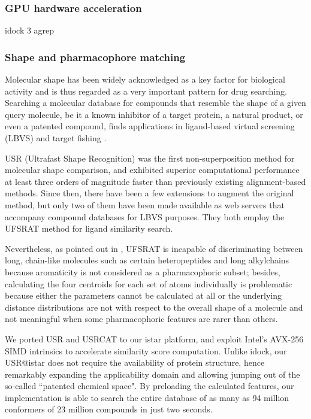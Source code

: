 \documentclass[a4paper,12pt]{article}
\begin{document}
\subsubsection*{GPU hardware acceleration}

idock 3
agrep \cite{1138}

\subsubsection*{Shape and pharmacophore matching}

Molecular shape has been widely acknowledged as a key factor for biological activity and is thus regarded as a very important pattern for drug searching. Searching a molecular database for compounds that resemble the shape of a given query molecule, be it a known inhibitor of a target protein, a natural product, or even a patented compound, finds applications in ligand-based virtual screening (LBVS) \citep{1332,1380,1281,1504,1502,1615} and target fishing \citep{1528,1407,1408,1402}.

USR (Ultrafast Shape Recognition) \citep{1379} was the first non-superposition method for molecular shape comparison, and exhibited superior computational performance at least three orders of magnitude faster than previously existing alignment-based methods. Since then, there have been a few extensions \citep{1333,1436,1437,1334,1335,1337,1338,1331,1407,1408} to augment the original method, but only two of them \citep{1436,1437} have been made available as web servers that accompany compound databases for LBVS purposes. They both employ the UFSRAT \citep{1436} method for ligand similarity search.

Nevertheless, as pointed out in \citep{1331}, UFSRAT is incapable of discriminating between long, chain-like molecules such as certain heteropeptides and long alkylchains because aromaticity is not considered as a pharmacophoric subset; besides, calculating the four centroids for each set of atoms individually is problematic because either the parameters cannot be calculated at all or the underlying distance distributions are not with respect to the overall shape of a molecule and not meaningful when some pharmacophoric features are rarer than others.

We ported USR \citep{1379} and USRCAT \citep{1331} to our istar platform, and exploit Intel's AVX-256 SIMD intrinsics to accelerate similarity score computation. Unlike idock, our USR@istar does not require the availability of protein structure, hence remarkably expanding the applicability domain and allowing jumping out of the so-called ``patented chemical space". By preloading the calculated features, our implementation is able to search the entire database of as many as 94 million conformers of 23 million compounds in just two seconds.
\end{document}
